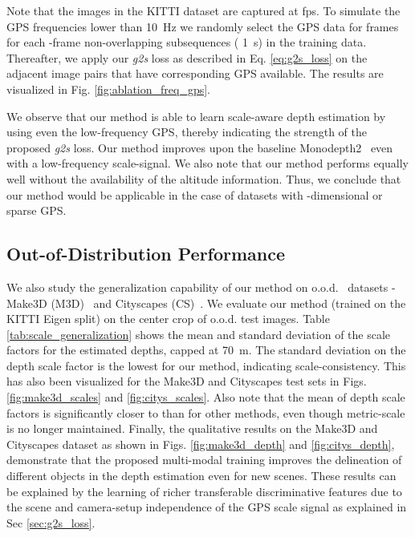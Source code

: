Note that the images in the KITTI dataset are captured at  fps. To simulate the GPS frequencies lower than \SI{10}{\Hz} 
we randomly select the GPS data for  frames for each -frame non-overlapping subsequences ( \SI{1}{s}) in the training data. Thereafter, we apply our \textit{g2s} loss as described in Eq. \ref{eq:g2s_loss} on the adjacent image pairs that have corresponding GPS available. The results are visualized in Fig. \ref{fig:ablation_freq_gps}.

We observe that our method is able to learn scale-aware depth estimation by using even the low-frequency GPS, thereby indicating the strength of the proposed \textit{g2s} loss. Our method improves upon the baseline Monodepth2~\cite{godard2019digging} even with a low-frequency scale-signal.
We also note that our method performs equally well without the availability of the altitude information. Thus, we conclude that our method would be applicable in the case of datasets with -dimensional or sparse GPS. 






\subsection{Out-of-Distribution Performance}
\label{sec:ood}
We also study the generalization capability of our method on o.o.d.~\cite{geirhos2020shortcut} datasets - Make3D (M3D)~\cite{saxena2008make3d} and Cityscapes (CS)~\cite{cordts2016cityscapes}. We evaluate our method (trained on the KITTI Eigen split) on the  center crop of o.o.d. test images. Table \ref{tab:scale_generalization} shows the mean and standard deviation of the scale factors for the estimated depths, capped at \SI{70}{\m}. The standard deviation on the depth scale factor is the lowest for our method, indicating scale-consistency. This has also been visualized for the Make3D and Cityscapes test sets in Figs. \ref{fig:make3d_scales} and \ref{fig:citys_scales}. Also note that the mean of depth scale factors is significantly closer to  than for other methods, even though metric-scale is no longer maintained. Finally, the qualitative results on the Make3D and Cityscapes dataset as shown in Figs. \ref{fig:make3d_depth} and \ref{fig:citys_depth},  demonstrate that the proposed multi-modal training improves the delineation of different objects in the depth estimation even for new scenes.  These results can be explained by the  learning of richer transferable discriminative features due to the scene and camera-setup independence of the GPS scale signal as explained in Sec \ref{sec:g2s_loss}. 





